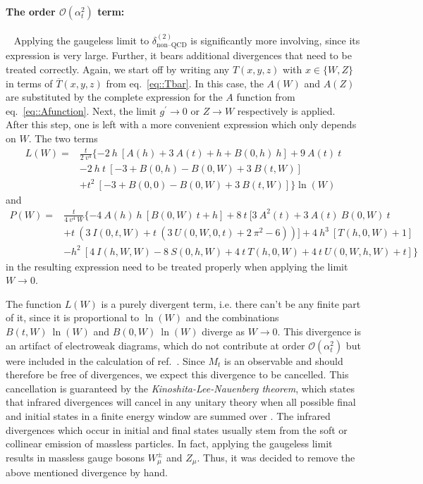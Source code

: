 \documentclass[a4paper,12pt]{book}
\begin{document}
\paragraph{The order $\mathcal{O}(\alpha^2_t)$ term:}
~\newline
Applying the gaugeless limit to $\delta^{(2)}_\text{non--QCD}$ is significantly more involving, since its expression is very large. Further, it bears additional divergences that need to be treated correctly. Again, we start off by writing any $T(x,y,z)$ with $x \in \{W,Z\}$ in terms of $\overline{T}(x,y,z)$ from eq.\ \eqref{eq::Tbar}. In this case, the $A(W)$ and $A(Z)$ are substituted by the complete expression for the $A$ function from eq.\ \eqref{eq::Afunction}. Next, the limit $g^\prime \rightarrow 0$ or $Z \rightarrow W$ respectively is applied. After this step, one is left with a more convenient expression which only depends on $W$. The two terms
\begin{align}
\nonumber
L(W)={}&\frac{t}{2\>v^4}\{-2\>h\>[A(h)+3\>A(t)+h+B(0,h)\>h]+9\>A(t) \> t\\
\nonumber
&-2\>h\>t\>[-3+B(0,h)-B(0,W)+3\>B(t,W)]\\
&+t^2\>[-3+B(0,0)-B(0,W)+3\>B(t,W)]\} \ln\left(W\right)
\end{align}
and 
\begin{align}
\nonumber
P(W)={}&\frac{t}{4\>v^4 \> W} \{-4\>A(h)\> h \>[B(0,W)\> t+h]+8\> t \>[3\> A^2(t)+3\> A(t) \> B(0,W)\> t\\
\nonumber
&+t\>(3\> I(0,t,W)+t\> (3\> U(0,W,0,t)+2\> \pi
^2-6))]+4\> h^3\> [T(h,0,W)+1]\\
\label{eq::WPOLE}
&-h^2 \>[4\> I(h,W,W)-8\> S(0,h,W)+4 \>t\> T(h,0,W)+4\> t \>U(0,W,h,W)+t]\}
\end{align}
in the resulting expression need to be treated properly when applying the limit $W\rightarrow 0$.\par
The function $L(W)$ is a purely divergent term, i.e. there can't be any finite part of it, since it is proportional to $\ln(W)$ and the combinations $B(t,W)\>\ln(W)$ and $B(0,W)\> \ln(W)$ diverge as $W \rightarrow 0$. This divergence is an artifact of electroweak diagrams, which do not contribute at order $\mathcal{O}(\alpha_t^2)$ but were included in the calculation of ref.\ \cite{martinmain}. Since $M_t$ is an observable and should therefore be free of divergences, we expect this divergence to be cancelled. This cancellation is guaranteed by the \textit{Kinoshita-Lee-Nauenberg theorem}, which states that infrared divergences will cancel in any unitary theory when all possible final and initial states in a finite energy window are summed over \cite{knl1,knl2}. The infrared divergences which occur in initial and final states usually stem from the soft or collinear emission of massless particles. In fact, applying the gaugeless limit results in massless gauge bosons $W^\pm_\mu$ and $Z_\mu$. Thus, it was decided to remove the above mentioned divergence by hand.\par 
\end{document}
